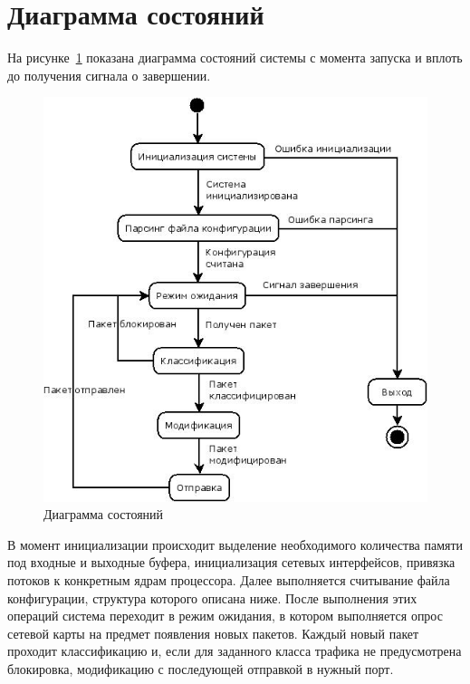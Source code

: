 \section{Диаграмма состояний}
На рисунке~\ref{pic:state_diagram} показана диаграмма состояний системы с момента запуска и вплоть до получения сигнала о завершении.
\begin{figure}[h]
\centering
\includegraphics[scale=0.6]{pictures/state_diagram}
\caption{Диаграмма состояний}
\label{pic:state_diagram}
\end{figure}

В момент инициализации происходит выделение необходимого количества памяти под входные и выходные буфера, инициализация сетевых интерфейсов, привязка потоков к конкретным ядрам процессора. Далее выполняется считывание файла конфигурации, структура которого описана ниже. После выполнения этих операций система переходит в режим ожидания, в котором выполняется опрос сетевой карты на предмет появления новых пакетов. Каждый новый пакет проходит классификацию и, если для заданного класса трафика не предусмотрена блокировка, модификацию с последующей отправкой в нужный порт.

